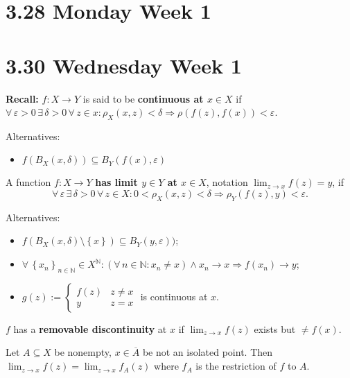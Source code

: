 \documentclass{notes}
\begin{document}
  \section{3.28 Monday Week 1}
  
  \section{3.30 Wednesday Week 1}
  
  \textbf{Recall:} $f \colon X \to Y$ is said to be \textbf{continuous at $x \in X$} if $\forall \, \varepsilon > 0 \, \exists \, \delta > 0 \, \forall \, z \in x: \rho_X(x, z) < \delta \Rightarrow \rho(f(z), f(x)) < \varepsilon$.

  Alternatives: 
  \begin{itemize}
    \item $f(B_X(x, \delta)) \subseteq B_Y(f(x), \varepsilon)$
  \end{itemize}
  
  \begin{defn}
    A function $f \colon X \to Y$ \textbf{has limit $y \in Y$ at $x \in X$}, notation $\lim_{z \to x} f(z) = y$, if 
    \[
      \forall \, \varepsilon \, \exists \, \delta > 0 \, \forall \, z \in X: 0 < \rho_X(x, z) < \delta \Rightarrow \rho_Y(f(z), y) < \varepsilon.
    \]
    
    Alternatives: 
    \begin{itemize}
      \item $f(B_X(x, \delta) \setminus \left \{ x \right \}) \subseteq B_Y(y, \varepsilon))$; 

      \item $\forall \, \left \{ x_n \right \}_{n \in \mathbb N} \in X^\mathbb N: (\forall \, n \in \mathbb N: x_n \neq x) \land x_n \to x \Rightarrow f(x_n) \to y$; 
        
      \item $g(z) := \begin{cases}
        f(z) & z \neq x \\ 
        y & z = x
      \end{cases}$ is continuous at $x$.
    \end{itemize}
  \end{defn}
  
  \begin{defn}
    $f$ has a \textbf{removable discontinuity} at $x$ if $\lim_{z \to x} f(z)$ exists but $\neq f(x)$.
  \end{defn}
  
  \begin{defn}
    Let $A \subseteq X$ be nonempty, $x \in \overline A$ be not an isolated point.
    Then $\lim_{z \to x} f(z) = \lim_{z \to x} f_A(z)$ where $f_A$ is the restriction of $f$ to $A$.
  \end{defn}
  
\end{document}
